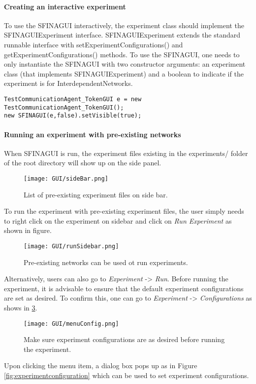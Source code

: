 \documentclass[11pt,fleqn]{book} %
\begin{document}
\paragraph{Creating an interactive experiment}
To use the SFINAGUI interactively, the experiment class should implement the SFINAGUIExperiment interface. SFINAGUIExperiment extends the standard runnable interface with setExperimentConfigurations() and getExperimentConfigurations() methods. To use the SFINAGUI, one needs to only instantiate the SFINAGUI with two constructor arguments: an experiment class (that implements SFINAGUIExperiment) and a boolean to indicate if the experiment is for InterdependentNetworks.
\begin{lstlisting}[frame=single] 
TestCommunicationAgent_TokenGUI e = new TestCommunicationAgent_TokenGUI();
new SFINAGUI(e,false).setVisible(true);
\end{lstlisting}

\paragraph{Running an experiment with pre-existing networks}
When SFINAGUI is run, the experiment files existing in the experiments/ folder of the root directory will show up on the side panel.
\begin{figure}[H]
	\centering
	\texttt{[image: GUI/sideBar.png]}
	\caption{List of pre-existing experiment files on side bar.}\label{fig:sidebar}
\end{figure}

To run the experiment with pre-existing experiment files, the user simply needs to right click on the experiment on sidebar and click on \textit{Run Experiment} as shown in figure.
\begin{figure}[H]
	\centering
	\texttt{[image: GUI/runSidebar.png]}
	\caption{Pre-existing networks can be used ot run experiments.}\label{fig:runsidebar}
\end{figure}

Alternatively, users can also go to \textit{Experiment} -> \textit{Run}. Before running the experiment, it is advisable to ensure that the default experiment configurations are set as desired. To confirm this, one can go to \textit{Experiment} -> \textit{Configurations} as shows in \ref{fig:menuConfig}.
\begin{figure}[H]
	\centering
	\texttt{[image: GUI/menuConfig.png]}
	\caption{Make sure experiment configurations are as desired before running the experiment.}\label{fig:menuConfig}	
\end{figure}
Upon clicking the menu item, a dialog box pops up as in Figure~ \ref{fig:experimentconfiguration} which can be used to set experiment configurations.
\end{document}
